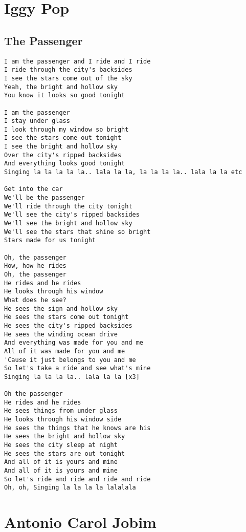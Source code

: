 \documentclass[a4paper]{article}
\begin{document}
\section{Iggy Pop} %
\label{sec:Iggy Pop}
\subsection{The Passenger} %
\label{sub:The Passenger}
\begin{Verbatim}[commandchars=\\\{\}]
I am the passenger and I ride and I ride
I ride through the city's backsides
I see the stars come out of the sky
Yeah, the bright and hollow sky
You know it looks so good tonight

I am the passenger
I stay under glass
I look through my window so bright
I see the stars come out tonight
I see the bright and hollow sky
Over the city's ripped backsides
And everything looks good tonight
Singing la la la la la.. lala la la, la la la la.. lala la la etc

Get into the car
We'll be the passenger
We'll ride through the city tonight
We'll see the city's ripped backsides
We'll see the bright and hollow sky
We'll see the stars that shine so bright
Stars made for us tonight

Oh, the passenger
How, how he rides
Oh, the passenger
He rides and he rides
He looks through his window
What does he see?
He sees the sign and hollow sky
He sees the stars come out tonight
He sees the city's ripped backsides
He sees the winding ocean drive
And everything was made for you and me
All of it was made for you and me
'Cause it just belongs to you and me
So let's take a ride and see what's mine
Singing la la la la.. lala la la [x3]

Oh the passenger
He rides and he rides
He sees things from under glass
He looks through his window side
He sees the things that he knows are his
He sees the bright and hollow sky
He sees the city sleep at night
He sees the stars are out tonight
And all of it is yours and mine
And all of it is yours and mine
So let's ride and ride and ride and ride
Oh, oh, Singing la la la la lalalala
\end{Verbatim}
\newpage
\section{Antonio Carol Jobim} %
\label{sec:Antonio Carol Jobim}
\end{document}
